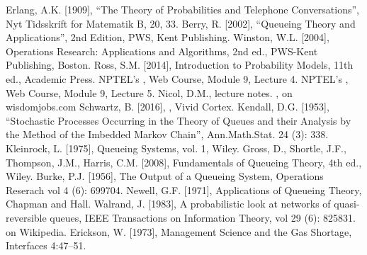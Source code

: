 \newpage{}
\begin{thebibliography}{99}
 Erlang, A.K. [1909], ``The Theory of Probabilities and Telephone Conversations'', Nyt Tidsskrift for Matematik B, 20, 33.
 Berry, R. [2002], ``Queueing Theory and Applications'', 2nd Edition, PWS, Kent Publishing.
 Winston, W.L. [2004], Operations Research: Applications and Algorithms, 2nd ed., PWS-Kent Publishing, Boston.
 Ross, S.M. [2014], Introduction to Probability Models,  11th ed., Academic Press. 
 NPTEL's , Web Course, Module 9, Lecture 4.
 NPTEL's , Web Course, Module 9, Lecture 5.
 Nicol, D.M.,  lecture notes.
 , on wisdomjobs.com
Schwartz, B. [2016],  , Vivid Cortex.
 Kendall, D.G. [1953], ``Stochastic Processes Occurring in the Theory of Queues and their Analysis by the Method of the Imbedded Markov Chain'', Ann.Math.Stat. 24 (3): 338.
 Kleinrock, L. [1975], Queueing Systems, vol. 1, Wiley.
 Gross, D., Shortle, J.F., Thompson, J.M., Harris, C.M. [2008], Fundamentals of Queueing Theory, 4th ed., Wiley.
 Burke, P.J. [1956], The Output of a Queueing System, Operations Reserach vol 4 (6): 699704.
 Newell, G.F. [1971], Applications of Queueing Theory, Chapman and Hall.
 Walrand, J. [1983], A probabilistic look at networks of quasi-reversible queues, IEEE Transactions on Information Theory, vol 29 (6): 825831.
  on Wikipedia.
 Erickson, W. [1973], Management Science and the Gas Shortage, Interfaces 4:47–51.
\end{thebibliography}



